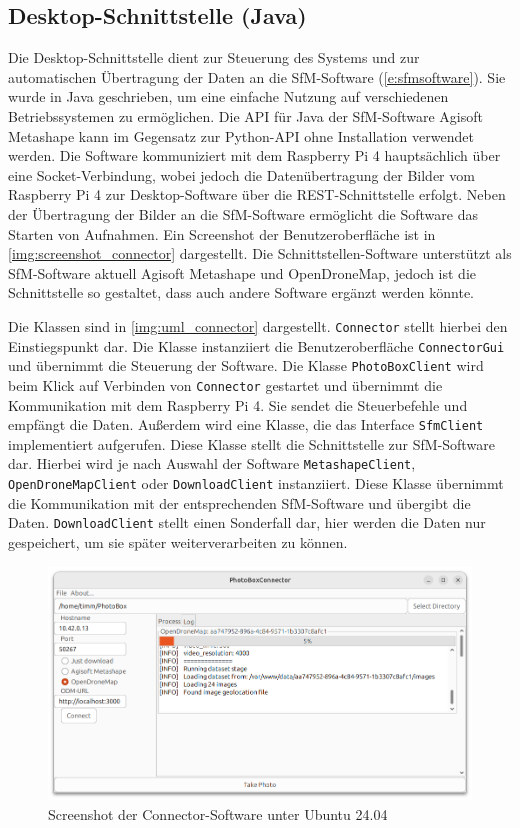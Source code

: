\documentclass[./00PhotoBox.tex]{subfiles}
\begin{document}
\subsection{Desktop-Schnittstelle (Java)}
Die Desktop-Schnittstelle dient zur Steuerung des Systems und zur automatischen Über\-tragung der Daten an die \Gls{SfM}-Software (\autoref{e:sfmsoftware}). Sie wurde in Java geschrieben, um eine einfache Nutzung auf verschiedenen Betriebssystemen zu ermöglichen. Die \Gls{API} für Java der \Gls{SfM}-Software Agisoft Metashape kann im Gegensatz zur Python-\Gls{API} ohne Installation verwendet werden. Die Software kommuniziert mit dem Raspberry Pi 4 hauptsächlich über eine \Gls{Socket}-Verbindung, wobei jedoch die Datenübertragung der Bilder vom Raspberry Pi 4 zur Desktop-Software über die \Gls{REST}-Schnittstelle erfolgt. Neben der Übertragung der Bilder an die \Gls{SfM}-Software ermöglicht die Software das Starten von Aufnahmen. Ein Screenshot der Benutzeroberfläche ist in \autoref{img:screenshot_connector} dargestellt. Die Schnittstellen-Software unterstützt als \Gls{SfM}-Software aktuell Agisoft Metashape und OpenDroneMap, jedoch ist die Schnittstelle so gestaltet, dass auch andere Software ergänzt werden könnte.

Die Klassen sind in \autoref{img:uml_connector} dargestellt. \texttt{Connector} stellt hierbei den Einstiegspunkt dar. Die Klasse instanziiert die Benutzeroberfläche \texttt{ConnectorGui} und übernimmt die Steuerung der Software. Die Klasse \texttt{PhotoBoxClient} wird beim Klick auf Verbinden von \texttt{Connector} gestartet und übernimmt die Kommunikation mit dem Raspberry Pi 4. Sie sendet die Steuerbefehle und empfängt die Daten. Außerdem wird eine Klasse, die das Interface \texttt{SfmClient} implementiert aufgerufen. Diese Klasse stellt die Schnittstelle zur \Gls{SfM}-Software dar. Hierbei wird je nach Auswahl der Software \texttt{MetashapeClient}, \texttt{OpenDroneMapClient} oder \texttt{DownloadClient} instanziiert. Diese Klasse übernimmt die Kommunikation mit der entsprechenden \Gls{SfM}-Software und übergibt die Daten. \texttt{DownloadClient} stellt einen Sonderfall dar, hier werden die Daten nur gespeichert, um sie später weiterverarbeiten zu können.

\begin{figure}
    \centering
    \includegraphics[width=1\textwidth]{./img/5_software/connector_screenshot.png}
    \caption{Screenshot der Connector-Software unter Ubuntu 24.04}
    \label{img:screenshot_connector}
\end{figure}
\end{document}
